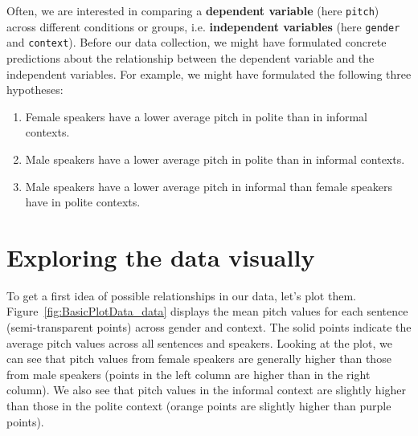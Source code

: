 \documentclass[nobib]{tufte-handout}
\begin{document}
Often, we are interested in comparing a \textbf{dependent variable} (here \texttt{pitch})
across different conditions or groups, i.e. \textbf{independent variables} (here \texttt{gender} and \texttt{context}). Before our data collection,
we might have formulated concrete predictions about the relationship between the dependent
variable and the independent variables. For example, we might have formulated the following three
hypotheses:

\begin{enumerate}[{H}1:]
\item Female speakers have a lower average pitch in polite than in informal contexts.
\item Male speakers have a lower average pitch in polite than in informal contexts.
\item Male speakers have a lower average pitch in informal than female speakers have in polite contexts.
\end{enumerate}

\section{Exploring the data visually}

To get a first idea of possible relationships in our data, let's plot
them. Figure~\ref{fig:BasicPlotData_data} displays the mean pitch values for each
sentence (semi-transparent points) across gender and context. The solid points indicate the
average pitch values across all sentences and speakers. Looking at the plot, we can see that pitch values
from female speakers are generally higher than those from male speakers (points in the left column
are higher than in the right column). We also see that pitch values in the informal context are slightly higher than those in the polite context (orange points are
slightly higher than purple points).
\end{document}
